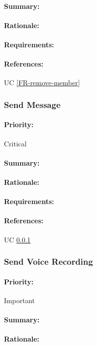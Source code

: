 \documentclass[11pt]{article}
\begin{document}
\paragraph{Summary:}
\paragraph{Rationale:}
\paragraph{Requirements:}
\paragraph{References:} UC \ref{FR-remove-member}
\subsubsection{Send Message} \label{FR-send-message}
\paragraph{Priority:}Critical
\paragraph{Summary:}
\paragraph{Rationale:}
\paragraph{Requirements:}
\paragraph{References:} UC \ref{FR-send-message}
\subsubsection{Send Voice Recording} \label{FR-send-voice}
\paragraph{Priority:}Important
\paragraph{Summary:}
\paragraph{Rationale:}
\end{document}
